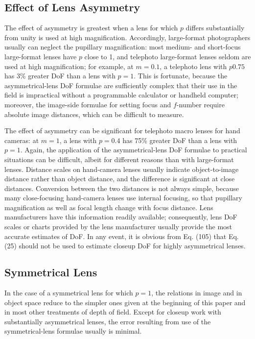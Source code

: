 \documentclass[11pt, oneside]{scrartcl}   	%
\begin{document}

\subsection{Effect of Lens Asymmetry}

The effect of asymmetry is greatest when a lens for which $p$ differs substantially from unity is used at high magnification. Accordingly, large-format photographers usually can neglect the pupillary magnification: most medium- and short-focus large-format lenses have $p$ close to 1, and telephoto large-format lenses seldom are used at high magnification; for example, at $m = 0.1$, a telephoto lens with $p  0.75$ has 3\% greater DoF than a lens with $p = 1$. This is fortunate, because the asymmetrical-lens DoF formulae are sufficiently complex that their use in the field is impractical without a programmable calculator or handheld computer; moreover, the image-side formulae for setting focus and $f$-number require absolute image distances, which can be difficult to measure.

The effect of asymmetry can be significant for telephoto macro lenses for hand cameras: at $m = 1$, a lens with $p = 0.4$ has 75\% greater DoF than a lens with $p = 1$. Again, the application of the asymmetrical-lens DoF formulae to practical situations can be difficult, albeit for different reasons than with large-format lenses. Distance scales on hand-camera lenses usually indicate object-to-image distance rather than object distance, and the difference is significant at close distances. Conversion between the two distances is not always simple, because many close-focusing hand-camera lenses use internal focusing, so that pupillary magnification as well as focal length change with focus distance. Lens manufacturers have this information readily available; consequently, lens DoF scales or charts provided by the lens manufacturer usually provide the most accurate estimates of DoF. In any event, it is obvious from Eq. (105) that Eq. (25) should not be used to estimate closeup DoF for highly asymmetrical lenses.

\subsection{Symmetrical Lens}

In the case of a symmetrical lens for which $p = 1$, the relations in image and in object space reduce to the simpler ones given at the beginning of this paper and in most other treatments of depth of field. Except for closeup work with substantially asymmetrical lenses, the error resulting from use of the symmetrical-lens formulae usually is minimal.
\end{document}
